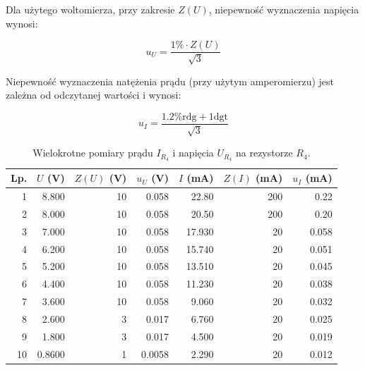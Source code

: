 \documentclass[a4paper]{article}
\newlength{\du}
\begin{document}
Dla użytego woltomierza, przy zakresie $Z(U)$, niepewność wyznaczenia napięcia wynosi:

$$u_U = \frac{1\% \cdot Z(U)}{\sqrt{3}}$$

Niepewność wyznaczenia natężenia prądu (przy użytym amperomierzu) jest zależna od odczytanej wartości i wynosi:

$$u_I = \frac{1.2\% \text{rdg} + 1 \text{dgt}}{\sqrt{3}}$$

\begin{table}
\centering
\begin{tabular}{rrrrrrr}
\toprule
Lp. &  $U$ (V) &  $Z(U)$ (V) &  $u_U$ (V) &  $I$ (mA) &  $Z(I)$ (mA) &  $u_I$ (mA) \\
\midrule
1 &          8.800  &                10 &                 0.058  &             22.80  &                200 &                     0.22 \\
2 &          8.000  &                10 &                 0.058  &             20.50  &                200 &                     0.20 \\
3 &          7.000  &                10 &                 0.058  &             17.930 &                 20 &                     0.058 \\
4 &          6.200  &                10 &                 0.058  &             15.740 &                 20 &                     0.051 \\
5 &          5.200  &                10 &                 0.058  &             13.510 &                 20 &                     0.045 \\
6 &          4.400  &                10 &                 0.058  &             11.230 &                 20 &                     0.038 \\
7 &          3.600  &                10 &                 0.058  &              9.060 &                 20 &                     0.032 \\
8 &          2.600  &                 3 &                 0.017  &              6.760 &                 20 &                     0.025 \\
9 &          1.800  &                 3 &                 0.017  &              4.500 &                 20 &                     0.019 \\
10 &         0.8600 &                 1 &                 0.0058 &              2.290 &                 20 &                     0.012 \\
\bottomrule
\end{tabular}
\caption{Wielokrotne pomiary prądu $I_{R_4}$ i napięcia $U_{R_4}$ na rezystorze $R_4$.}
\label{pomiary_r4}
\end{table}
\end{document}
